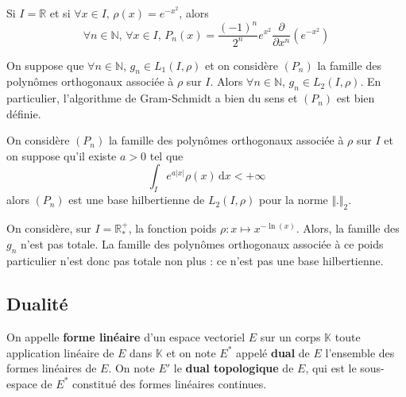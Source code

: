   \begin{example}
    Si $I = \mathbb{R}$ et si $\forall x \in I, \, \rho(x) = e^{-x^2}$, alors
    \[ \forall n \in \mathbb{N}, \, \forall x \in I, \, P_n(x) = \frac{(-1)^n}{2^n} e^{x^2} \frac{\partial}{\partial x^n} \left( e^{-x^2} \right) \]
  \end{example}


  \begin{lemma}
    On suppose que $\forall n \in \mathbb{N}$, $g_n \in L_1(I, \rho)$ et on considère $(P_n)$ la famille des polynômes orthogonaux associée à $\rho$ sur $I$. Alors $\forall n \in \mathbb{N}$, $g_n \in L_2(I, \rho)$. En particulier, l'algorithme de Gram-Schmidt a bien du sens et $(P_n)$ est bien définie.
  \end{lemma}

  \begin{application}
    On considère $(P_n)$ la famille des polynômes orthogonaux associée à $\rho$ sur $I$ et on suppose qu'il existe $a > 0$ tel que
    \[ \int_I e^{a \vert x \vert} \rho(x) \, \mathrm{d}x < +\infty \]
    alors $(P_n)$ est une base hilbertienne de $L_2(I, \rho)$ pour la norme $\Vert . \Vert_2$.
  \end{application}

  \begin{cexample}
    On considère, sur $I = \mathbb{R}^+_*$, la fonction poids $\rho : x \mapsto x^{-\ln(x)}$. Alors, la famille des $g_n$ n'est pas totale. La famille des polynômes orthogonaux associée à ce poids particulier n'est donc pas totale non plus : ce n'est pas une base hilbertienne.
  \end{cexample}

  \subsection{Dualité}


  \begin{definition}
    On appelle \textbf{forme linéaire} d'un espace vectoriel $E$ sur un corps $\mathbb{K}$ toute application linéaire de $E$ dans $\mathbb{K}$ et on note $E^*$ appelé \textbf{dual} de $E$ l'ensemble des formes linéaires de $E$.
    \newpar
    On note $E'$ le \textbf{dual topologique} de $E$, qui est le sous-espace de $E^*$ constitué des formes linéaires continues.
  \end{definition}

